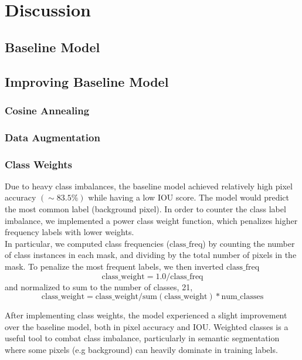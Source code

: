 \documentclass{article}
\begin{document}
\section{Discussion}
\subsection{Baseline Model}


\subsection{Improving Baseline Model}
\subsubsection{Cosine Annealing}
\label{cosine}
\subsubsection{Data Augmentation}
\subsubsection{Class Weights}
Due to heavy class imbalances, the baseline model achieved relatively high pixel accuracy $(\sim 83.5 \% )$ while having a low IOU score. The model would predict the most common label (background pixel). In order to counter the class label imbalance, we implemented a power class weight function, which penalizes higher frequency labels with lower weights. \\

In particular, we computed class frequencies ($\text{class}\_\text{freq}$) by counting the number of class instances in each mask, and dividing by the total number of pixels in the mask. To penalize the most frequent labels, we then inverted $\text{class}\_\text{freq}$
\begin{equation}
    \text{class}\_\text{weight}=1.0 / \text{class}\_\text{freq}
\end{equation}
and normalized to sum to the number of classes, 21, 
\begin{equation}
    \text{class}\_\text{weight}=\text{class}\_\text{weight} / \text{sum}(\text{class}\_\text{weight}) * \text{num}\_\text{classes}
\end{equation}

After implementing class weights, the model experienced a slight improvement over the baseline model, both in pixel accuracy and IOU. Weighted classes is a useful tool to combat class imbalance, particularly in semantic segmentation where some pixels (e.g background) can heavily dominate in training labels.
\end{document}
